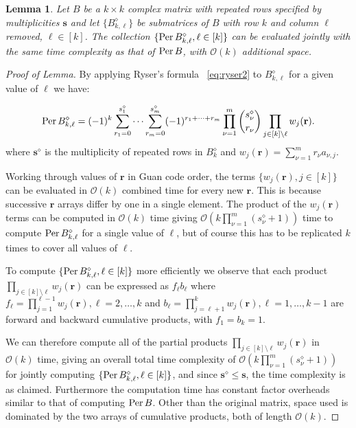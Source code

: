 \documentclass[a4paper,11pt]{article}
\newtheorem{lemma}{Lemma}%
\newcommand{\perm}{\mathop{\textup{Per}}}
\newcommand{\bigo}[1]{\mathcal{O}(#1)}
\newcommand{\Bkl}{B^{\diamond}_{k,\ell}}
\newcommand{\Bk}{B^{\diamond}_{k}}
\begin{document}
\vspace{0.5em}
\begin{lemma}\label{minors}
	Let $B$ be a $k \times k$ complex matrix with repeated rows specified by multiplicities $\mathbf{s}$ and let $\{\Bkl\}$ be submatrices of $B$ with row $k$ and column $\ell$ removed, $\ell \in [k]$. The collection $\{\perm  \Bkl, \ell \in [k]\}$ can be evaluated jointly with the same time complexity as that of $\perm B$, with $\bigo{k}$ additional space.  
\end{lemma}
\begin{proof}[Proof of Lemma]
	By applying Ryser's formula ~\eqref{eq:ryser2} to $\Bkl$ for a given value of $\ell$ we have:
	
	\begin{equation}%
	\perm  \Bkl = (-1)^k \sum_{r_1 = 0}^{s_1^\diamond} \cdots \sum_{r_m = 0}^{s_m^\diamond} (-1)^{r_1 + \cdots +r_m}\prod_{\nu=1}^m \binom{s_\nu^\diamond}{r_\nu}  \prod_{j \in [k] \setminus \ell}  w_j(\mathbf{r}).
	\end{equation}
	where $\mathbf{s}^\diamond$ is the multiplicity of repeated rows in $\Bk$ and $w_j(\mathbf{r}) = \sum_{\nu=1}^m r_\nu a_{\nu,j}$. 
	
	Working through values of $\mathbf{r}$ in Guan code order, the terms $\{w_j(\mathbf{r}), j \in [k]\}$ can be evaluated in $\bigo{k}$ combined time for every new $\mathbf{r}$. This is because successive $\mathbf{r}$ arrays differ by one in a single element. The product of the $w_j(\mathbf{r})$ terms can be computed in $\bigo{k}$ time giving $\bigo{k\prod_{\nu=1}^m (s^\diamond_\nu+1)}$ time to compute $\perm  \Bkl$ for a single value of $\ell$, but of course this has to be replicated $k$ times to cover all values of $\ell$. 
	
	To compute $\{\perm  \Bkl,  \ell \in [k]\}$ more efficiently we observe that each product $\prod_{j \in [k] \setminus \ell}  w_j(\mathbf{r})$ can be expressed as $f_\ell b_\ell$  where $f_\ell = \prod_{j=1}^{\ell-1} w_j(\mathbf{r}), \ell = 2,\dots,k$ and $b_\ell = \prod_{j=\ell+1}^k  w_j(\mathbf{r}), \ell = 1,\dots,k-1$ are forward and backward cumulative products, with $f_1 = b_k = 1$.  
	
	We can therefore compute all of the partial products $\prod_{j \in [k] \setminus \ell}   w_j(\mathbf{r})$ in $\bigo{k}$ time, giving an overall total time complexity of $\bigo{k\prod_{\nu=1}^m (s^\diamond_\nu+1)}$ for jointly computing $\{\perm  \Bkl, \ell \in [k]\}$, and since $\mathbf{s}^\diamond \leqslant \mathbf{s}$, the time complexity is as claimed. Furthermore the computation time has constant factor overheads similar to that of computing $\perm B$. Other than the original matrix, space used is dominated by the two arrays of cumulative products, both of length $\bigo{k}$. 
\end{proof}  
\end{document}
